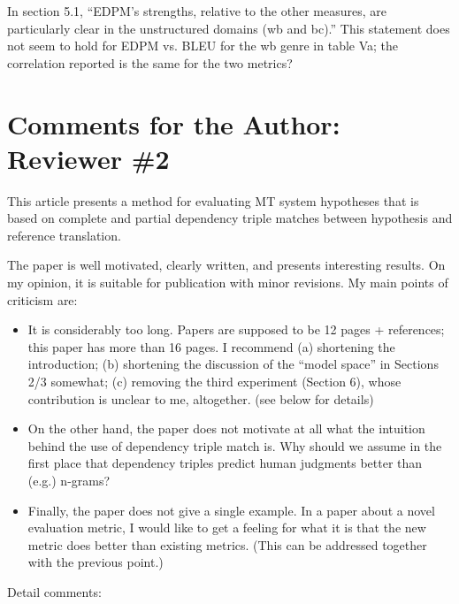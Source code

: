\documentclass[letterpaper,12pt]{article}
\begin{document}
In section 5.1, ``EDPM's strengths, relative to the other measures, are
particularly clear in the unstructured domains (wb and bc).''  This
statement does not seem to hold for EDPM vs. BLEU for the wb genre in
table Va; the correlation reported is the same for the two metrics?

\section{Comments for the Author: Reviewer \#2}
\label{sec:reviewer2}

This article presents a method for evaluating MT system hypotheses
that is based on complete and partial dependency triple matches
between hypothesis and reference translation.

The paper is well motivated, clearly written, and presents interesting
results. On my opinion, it is suitable for publication with minor
revisions. My main points of criticism are:

\begin{itemize}
\item It is considerably too long. Papers are supposed to be 12 pages
  + references; this paper has more than 16 pages. I recommend (a)
  shortening the introduction; (b) shortening the discussion of the
  ``model space'' in Sections 2/3 somewhat; (c) removing the third
  experiment (Section 6), whose contribution is unclear to me,
  altogether. (see below for details)

\item On the other hand, the paper does not motivate at all what the
  intuition behind the use of dependency triple match is. Why should
  we assume in the first place that dependency triples predict human
  judgments better than (e.g.) n-grams?

\item Finally, the paper does not give a single example. In a paper
  about a novel evaluation metric, I would like to get a feeling for
  what it is that the new metric does better than existing
  metrics. (This can be addressed together with the previous point.)
\end{itemize}

Detail comments:
\end{document}
